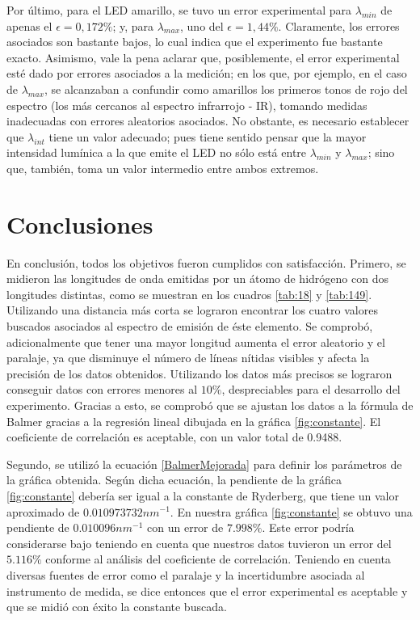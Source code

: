 \documentclass[%
 reprint,
 amsmath,amssymb,
 aps,
]{revtex4-1}
\begin{document}
Por último, para el LED amarillo, se tuvo un error experimental para  $\lambda_{min}$ de apenas el $\epsilon = 0,172 \%$; y, para $\lambda_{max}$, uno del $\epsilon = 1,44 \%$. Claramente, los errores asociados son bastante bajos, lo cual indica que el experimento fue bastante exacto. Asimismo, vale la pena aclarar que, posiblemente, el error experimental esté dado por errores asociados a la medición; en los que, por ejemplo, en el caso de $\lambda_{max}$, se alcanzaban a confundir como amarillos los primeros tonos de rojo del espectro (los más cercanos al espectro infrarrojo - IR), tomando medidas inadecuadas con errores aleatorios asociados. No obstante, es necesario establecer que $\lambda_{int}$ tiene un valor adecuado; pues tiene sentido pensar que la mayor intensidad lumínica a la que emite el LED no sólo está entre $\lambda_{min}$ y $\lambda_{max}$; sino que, también, toma un valor intermedio entre ambos extremos. 

\section{\label{sec:conclusiones} Conclusiones}

En conclusión, todos los objetivos fueron cumplidos con satisfacción. Primero, se midieron las longitudes de onda emitidas por un átomo de hidrógeno con dos longitudes distintas, como se muestran en los cuadros \ref{tab:18} y \ref{tab:149}. Utilizando una distancia más corta se lograron encontrar los cuatro valores buscados asociados al espectro de emisión de éste elemento. Se comprobó, adicionalmente que tener una mayor longitud aumenta el error aleatorio y el paralaje, ya que disminuye el número de líneas nítidas visibles y afecta la precisión de los datos obtenidos. Utilizando los datos más precisos se lograron conseguir datos con errores menores al $10\%$, despreciables para el desarrollo del experimento. Gracias a esto, se comprobó que se ajustan los datos a la fórmula de Balmer gracias a la regresión lineal dibujada en la gráfica \ref{fig:constante}. El coeficiente de correlación es aceptable, con un valor total de 0.9488. 

Segundo, se utilizó la ecuación \eqref{BalmerMejorada} para definir los parámetros de la gráfica obtenida. Según dicha ecuación, la pendiente de la gráfica \ref{fig:constante} debería ser igual a la constante de Ryderberg, que tiene un valor aproximado de $0.010973732 nm^{-1}$. En nuestra gráfica \ref{fig:constante} se obtuvo una pendiente de $0.010096 nm^{-1}$ con un error de $7.998\%$. Este error podría considerarse bajo teniendo en cuenta que nuestros datos tuvieron un error del $5.116\%$ conforme al análisis del coeficiente de correlación. Teniendo en cuenta diversas fuentes de error como el paralaje y la incertidumbre asociada al instrumento de medida, se dice entonces que el error experimental es aceptable y que se midió con éxito la constante buscada.
\end{document}
